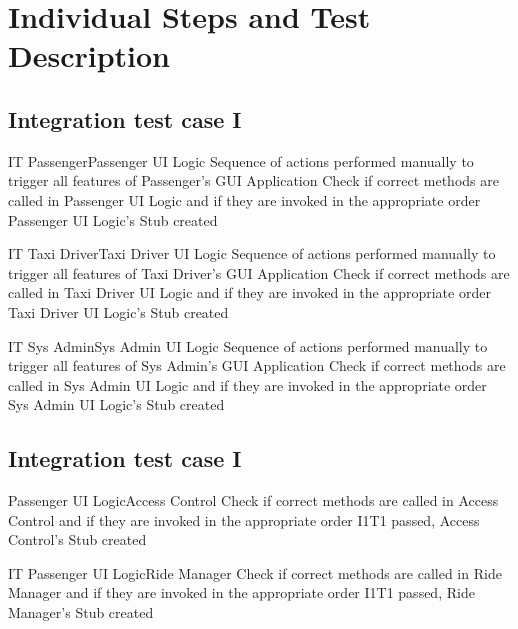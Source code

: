 \newpage
\section{Individual Steps and Test Description}

\subsection{Integration test case I}

\tctable
{IT}
{Passenger\textrightarrow Passenger UI Logic}
{
}
{Sequence of actions performed manually to trigger all features of Passenger's GUI Application}
{Check if correct methods are called in Passenger UI Logic and if they are invoked in the appropriate order}
{Passenger UI Logic's Stub created}

\vspace{2ex}
\tctable
{IT}
{Taxi Driver\textrightarrow Taxi Driver UI Logic}
{
}
{Sequence of actions performed manually to trigger all features of Taxi Driver's GUI Application}
{Check if correct methods are called in Taxi Driver UI Logic and if they are invoked in the appropriate order}
{Taxi Driver UI Logic's Stub created}

\vspace{2ex}
\tctable
{IT}
{Sys Admin\textrightarrow Sys Admin UI Logic}
{
}
{Sequence of actions performed manually to trigger all features of Sys Admin's GUI Application}
{Check if correct methods are called in Sys Admin UI Logic and if they are invoked in the appropriate order}
{Sys Admin UI Logic's Stub created}


\subsection{Integration test case I}
\setcounter{testcounter}{1}
{Passenger UI Logic\textrightarrow Access Control}
{
}
{}
{Check if correct methods are called in Access Control and if they are invoked in the appropriate order}
{I1T1 passed, Access Control's Stub created}

\vspace{2ex}
\tctable
{IT}
{Passenger UI Logic\textrightarrow Ride Manager}
{
}
{}
{Check if correct methods are called in Ride Manager and if they are invoked in the appropriate order}
{I1T1 passed, Ride Manager's Stub created}

